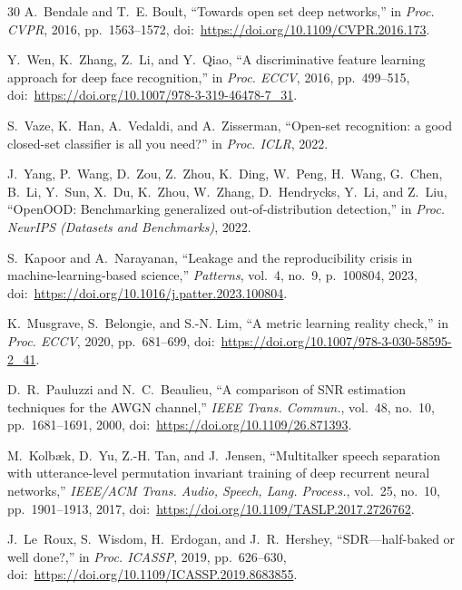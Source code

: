 \documentclass[review,12pt]{elsarticle}
\begin{document}
\begin{thebibliography}{30}
A.~Bendale and T.~E. Boult,
``Towards open set deep networks,''
in \emph{Proc. CVPR}, 2016, pp.~1563--1572,
doi:~\url{https://doi.org/10.1109/CVPR.2016.173}.

Y.~Wen, K.~Zhang, Z.~Li, and Y.~Qiao,
``A discriminative feature learning approach for deep face
recognition,''
in \emph{Proc. ECCV}, 2016, pp.~499--515,
doi:~\url{https://doi.org/10.1007/978-3-319-46478-7_31}.

S.~Vaze, K.~Han, A.~Vedaldi, and A.~Zisserman,
``Open-set recognition: a good closed-set classifier is all you need?''
in \emph{Proc. ICLR}, 2022.

J.~Yang, P.~Wang, D.~Zou, Z.~Zhou, K.~Ding, W.~Peng, H.~Wang,
G.~Chen, B.~Li, Y.~Sun, X.~Du, K.~Zhou, W.~Zhang, D.~Hendrycks, Y.~Li,
and Z.~Liu,
``OpenOOD: Benchmarking generalized out-of-distribution detection,''
in \emph{Proc. NeurIPS (Datasets and Benchmarks)}, 2022.

S.~Kapoor and A.~Narayanan,
``Leakage and the reproducibility crisis in machine-learning-based
science,''
\emph{Patterns}, vol.~4, no.~9, p.~100804, 2023,
doi:~\url{https://doi.org/10.1016/j.patter.2023.100804}.

K.~Musgrave, S.~Belongie, and S.-N. Lim,
``A metric learning reality check,''
in \emph{Proc. ECCV}, 2020, pp.~681--699,
doi:~\url{https://doi.org/10.1007/978-3-030-58595-2_41}.

D.~R.~Pauluzzi and N.~C.~Beaulieu,
``A comparison of SNR estimation techniques for the AWGN channel,''
\emph{IEEE Trans. Commun.}, vol.~48, no.~10, pp.~1681--1691, 2000,
doi:~\url{https://doi.org/10.1109/26.871393}.

M.~Kolb{\ae}k, D.~Yu, Z.-H. Tan, and J.~Jensen,
``Multitalker speech separation with utterance-level permutation
invariant training of deep recurrent neural networks,''
\emph{IEEE/ACM Trans. Audio, Speech, Lang. Process.}, vol.~25, no.~10,
pp.~1901--1913, 2017,
doi:~\url{https://doi.org/10.1109/TASLP.2017.2726762}.

J.~Le~Roux, S.~Wisdom, H.~Erdogan, and J.~R.~Hershey,
``SDR---half-baked or well done?,''
in \emph{Proc. ICASSP}, 2019, pp.~626--630,
doi:~\url{https://doi.org/10.1109/ICASSP.2019.8683855}.

\end{thebibliography}
\end{document}
